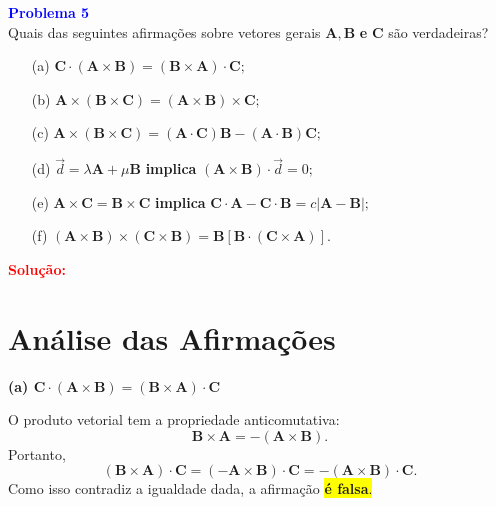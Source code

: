 \documentclass[a4paper,12pt]{article}
\begin{document}
\begin{flushleft}
\textbf{\textcolor{blue}{Problema 5}}\\

Quais das seguintes afirmações sobre vetores gerais $\mathbf{A}, \mathbf{B}$ \textbf{e} $\mathbf{C}$ são verdadeiras?

\begin{enumerate}
    \item[(a)] $\mathbf{C} \cdot (\mathbf{A} \times \mathbf{B}) = (\mathbf{B} \times \mathbf{A}) \cdot \mathbf{C};$
    \item[(b)] $\mathbf{A} \times (\mathbf{B} \times \mathbf{C}) = (\mathbf{A} \times \mathbf{B}) \times \mathbf{C};$
    \item[(c)] $\mathbf{A} \times (\mathbf{B} \times \mathbf{C}) = (\mathbf{A} \cdot \mathbf{C})\mathbf{B} - (\mathbf{A} \cdot \mathbf{B})\mathbf{C};$
    \item[(d)] $\vec{d} = \lambda \mathbf{A} + \mu \mathbf{B}$ \textbf{implica} $(\mathbf{A} \times \mathbf{B}) \cdot \vec{d} = 0;$
    \item[(e)] $\mathbf{A} \times \mathbf{C} = \mathbf{B} \times \mathbf{C}$ \textbf{implica} $\mathbf{C} \cdot \mathbf{A} - \mathbf{C} \cdot \mathbf{B} = c |\mathbf{A} - \mathbf{B}|;$
    \item[(f)] $(\mathbf{A} \times \mathbf{B}) \times (\mathbf{C} \times \mathbf{B}) = \mathbf{B} [\mathbf{B} \cdot (\mathbf{C} \times \mathbf{A})].$
\end{enumerate}

\textcolor{red}{\textbf{Solução:}}\\

\section*{Análise das Afirmações}

\textbf{(a) $\mathbf{C} \cdot (\mathbf{A} \times \mathbf{B}) = (\mathbf{B} \times \mathbf{A}) \cdot \mathbf{C}$}

O produto vetorial tem a propriedade anticomutativa:
\begin{equation}
    \mathbf{B} \times \mathbf{A} = - (\mathbf{A} \times \mathbf{B}).
\end{equation}
Portanto,
\begin{equation}
    (\mathbf{B} \times \mathbf{A}) \cdot \mathbf{C} = (- \mathbf{A} \times \mathbf{B}) \cdot \mathbf{C} = - (\mathbf{A} \times \mathbf{B}) \cdot \mathbf{C}.
\end{equation}
Como isso contradiz a igualdade dada, a afirmação \colorbox{yellow}{\textbf{é falsa}.}


\end{flushleft}
\end{document}
